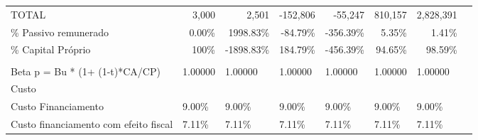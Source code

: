 \documentclass[11pt]{article}
\begin{document}
\begin{adjustbox}{center}
\begin{tabular}{lrrrrrrr}
			\multicolumn{1}{|l|}{TOTAL}                                   & \multicolumn{1}{r|}{3,000}      & \multicolumn{1}{r|}{2,501}     & \multicolumn{1}{r|}{-152,806}  & \multicolumn{1}{r|}{-55,247}    & \multicolumn{1}{r|}{810,157}  & \multicolumn{1}{r|}{2,828,391}   &                                \\ \cline{1-7}
			\multicolumn{1}{|l|}{\% Passivo remunerado}                   & \multicolumn{1}{r|}{0.00\%}    & \multicolumn{1}{r|}{1998.83\%}  & \multicolumn{1}{r|}{-84.79\%} & \multicolumn{1}{r|}{-356.39\%} & \multicolumn{1}{r|}{5.35\%}  & \multicolumn{1}{r|}{1.41\%}    &                                \\ \cline{1-7}
			\multicolumn{1}{|l|}{\% Capital Próprio}                      & \multicolumn{1}{r|}{100\%}     & \multicolumn{1}{r|}{-1898.83\%} & \multicolumn{1}{r|}{184.79\%} & \multicolumn{1}{r|}{-456.39\%}  & \multicolumn{1}{r|}{94.65\%} & \multicolumn{1}{r|}{98.59\%}   &                                \\ \cline{1-7}
			& \multicolumn{1}{l}{}           & \multicolumn{1}{l}{}           & \multicolumn{1}{l}{}          & \multicolumn{1}{l}{}           & \multicolumn{1}{l}{}         & \multicolumn{1}{l}{}           & \multicolumn{1}{l}{}           \\ \cline{2-7}
			\multicolumn{1}{l|}{Beta p = Bu * (1+ (1-t)*CA/CP)}           & \multicolumn{1}{l|}{1.00000}   & \multicolumn{1}{l|}{1.00000}   & \multicolumn{1}{l|}{1.00000}  & \multicolumn{1}{l|}{1.00000}   & \multicolumn{1}{l|}{1.00000} & \multicolumn{1}{l|}{1.00000}   & \multicolumn{1}{l}{}           \\ \cline{2-7}
			Custo                                                         & \multicolumn{1}{l}{}           & \multicolumn{1}{l}{}           & \multicolumn{1}{l}{}          & \multicolumn{1}{l}{}           & \multicolumn{1}{l}{}         & \multicolumn{1}{l}{}           & \multicolumn{1}{l}{}           \\ \cline{1-7}
			\multicolumn{1}{|l|}{Custo Financiamento}                     & \multicolumn{1}{l|}{9.00\%}    & \multicolumn{1}{l|}{9.00\%}    & \multicolumn{1}{l|}{9.00\%}   & \multicolumn{1}{l|}{9.00\%}    & \multicolumn{1}{l|}{9.00\%}  & \multicolumn{1}{l|}{9.00\%}    & \multicolumn{1}{l}{}           \\ \cline{1-7}
			\multicolumn{1}{|l|}{Custo financiamento com efeito fiscal}   & \multicolumn{1}{l|}{7.11\%}    & \multicolumn{1}{l|}{7.11\%}    & \multicolumn{1}{l|}{7.11\%}   & \multicolumn{1}{l|}{7.11\%}    & \multicolumn{1}{l|}{7.11\%}  & \multicolumn{1}{l|}{7.11\%}    & \multicolumn{1}{l}{}           \\ \cline{1-7}

\end{tabular}
\end{adjustbox}
\end{document}
